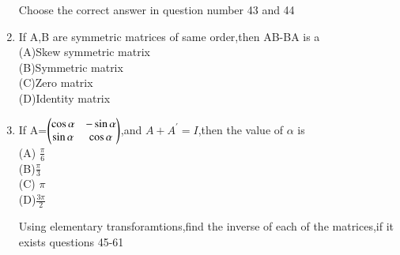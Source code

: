 \begin{enumerate}[label=\arabic*.,ref=\thesubsection.\theenumi]
  Choose the correct answer in question number 43 and 44\\
  \item If A,B are symmetric matrices of same order,then AB-BA is a\\
  (A)Skew symmetric matrix \\(B)Symmetric matrix\\
  (C)Zero matrix \\ (D)Identity matrix\\
  \item If A=$\begin{pmatrix}\cos\alpha &-\sin\alpha\\ \sin\alpha &\cos\alpha\end{pmatrix}$,and $A+A^{'}=I$,then the value of $\alpha$ is\\
  (A) $\frac{\pi}{6}$\\ (B)$\frac{\pi}{3}$ \\
  (C) $\pi$ \\ (D)$\frac{3\pi}{2}$\\
\solution 

  
  Using elementary transforamtions,find the inverse of each of the matrices,if it exists questions 45-61\\
  

\end{enumerate}
